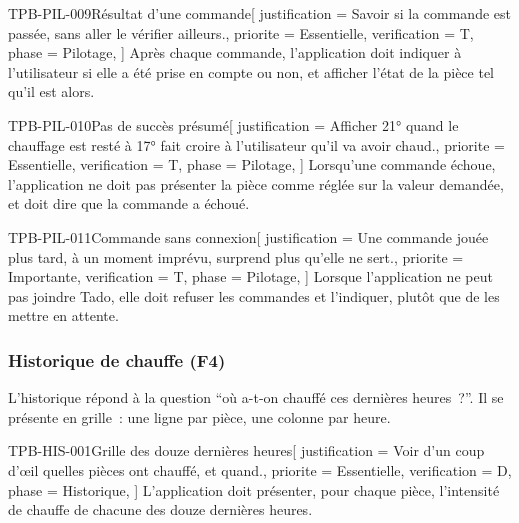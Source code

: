 \begin{exigence}{TPB-PIL-009}{Résultat d'une commande}[
    justification = {Savoir si la commande est passée, sans aller le vérifier ailleurs.},
    priorite      = {Essentielle},
    verification  = {T},
    phase         = {Pilotage},
  ]
  Après chaque commande, l'application doit indiquer à l'utilisateur si elle a été prise en
  compte ou non, et afficher l'état de la pièce tel qu'il est alors.
\end{exigence}

\begin{exigence}{TPB-PIL-010}{Pas de succès présumé}[
    justification = {Afficher 21° quand le chauffage est resté à 17° fait croire à l'utilisateur
                     qu'il va avoir chaud.},
    priorite      = {Essentielle},
    verification  = {T},
    phase         = {Pilotage},
  ]
  Lorsqu'une commande échoue, l'application ne doit pas présenter la pièce comme réglée
  sur la valeur demandée, et doit dire que la commande a échoué.
\end{exigence}

\begin{exigence}{TPB-PIL-011}{Commande sans connexion}[
    justification = {Une commande jouée plus tard, à un moment imprévu, surprend plus
                     qu'elle ne sert.},
    priorite      = {Importante},
    verification  = {T},
    phase         = {Pilotage},
  ]
  Lorsque l'application ne peut pas joindre Tado, elle doit refuser les commandes et
  l'indiquer, plutôt que de les mettre en attente.
\end{exigence}

\subsubsection{Historique de chauffe (F4)}
\label{sec:historique}

L'historique répond à la question \enquote{où a-t-on chauffé ces dernières heures~?}. Il
se présente en grille~: une ligne par pièce, une colonne par heure.

\begin{exigence}{TPB-HIS-001}{Grille des douze dernières heures}[
    justification = {Voir d'un coup d'œil quelles pièces ont chauffé, et quand.},
    priorite      = {Essentielle},
    verification  = {D},
    phase         = {Historique},
  ]
  L'application doit présenter, pour chaque pièce, l'intensité de chauffe de chacune des
  douze dernières heures.
\end{exigence}


